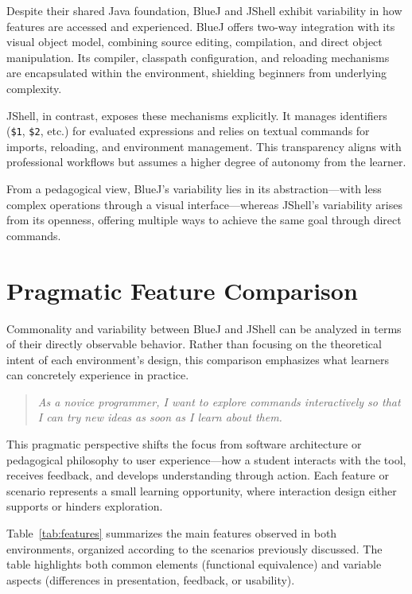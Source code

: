 \documentclass{article}
\begin{document}
Despite their shared Java foundation, BlueJ and JShell exhibit variability in how features are accessed and experienced. BlueJ offers two-way integration with its visual object model, combining source editing, compilation, and direct object manipulation. Its compiler, classpath configuration, and reloading mechanisms are encapsulated within the environment, shielding beginners from underlying complexity.

JShell, in contrast, exposes these mechanisms explicitly. It manages identifiers (\texttt{\$1}, \texttt{\$2}, etc.) for evaluated expressions and relies on textual commands for imports, reloading, and environment management. This transparency aligns with professional workflows but assumes a higher degree of autonomy from the learner.

From a pedagogical view, BlueJ’s variability lies in its abstraction—with less complex operations through a visual interface—whereas JShell’s variability arises from its openness, offering multiple ways to achieve the same goal through direct commands.


\section{Pragmatic Feature Comparison}

Commonality and variability between BlueJ and JShell can be analyzed in terms of their directly observable behavior. Rather than focusing on the theoretical intent of each environment’s design, this comparison emphasizes what learners can concretely experience in practice.

\begin{quote}
\textit{As a novice programmer,  
I want to explore commands interactively  
so that I can try new ideas as soon as I learn about them.}
\end{quote}

This pragmatic perspective shifts the focus from software architecture or pedagogical philosophy to user experience—how a student interacts with the tool, receives feedback, and develops understanding through action. Each feature or scenario represents a small learning opportunity, where interaction design either supports or hinders exploration.

Table~\ref{tab:features} summarizes the main features observed in both environments, organized according to the scenarios previously discussed. The table highlights both common elements (functional equivalence) and variable aspects (differences in presentation, feedback, or usability).
\end{document}
